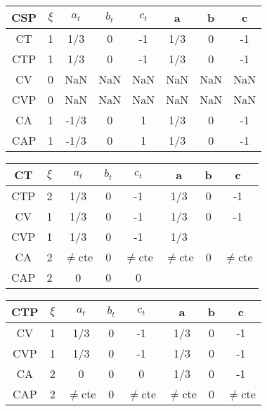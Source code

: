 \documentclass[twocolumn]{article}
\begin{document}
\begin{table}[H]
	\begin{tabular}{|c|c|c|c|c|c|c|c|}
		\hline
		CSP & $\xi $& $a_t$ & $b_t$ & $c_t$ & a & b & c \\
		\hline
		CT & 1 & 1/3  & 0 & -1 & 1/3  & 0 & -1 \\
		\hline
		CTP & 1 & 1/3  & 0  & -1  & 1/3  & 0 & -1 \\
		\hline
		CV &  0 & NaN  & NaN  & NaN  &NaN & NaN  &  NaN \\
		\hline
		CVP & 0  & NaN  &  NaN  &  NaN  & NaN  & NaN &  NaN\\
		\hline
		CA & 1 & -1/3 & 0  & 1  & 1/3  & 0 & -1   \\
		\hline
		CAP & 1 &  -1/3 & 0  & 1  & 1/3  & 0 & -1  \\
		\hline
	\end{tabular}
\end{table}

\begin{table}[H]
	\begin{tabular}{|c|c|c|c|c|c|c|c|}
		\hline
		CT & $\xi $& $a_t$ & $b_t$ & $c_t$ & a & b & c \\
		\hline
		CTP & 2 & 1/3  & 0  &  -1  & 1/3  & 0  &  -1 \\
		\hline
		CV & 1 & 1/3  & 0  & -1  & 1/3  & 0  &  -1 \\
		\hline
		CVP & 1 & 1/3  & 0  &  -1 & 1/3  &   &   \\
		\hline
		CA & 2 & $\neq$cte  & 0 &  $\neq$cte & $\neq$cte  & 0 &  $\neq$cte \\
		\hline
		CAP & 2 & 0  & 0  & 0  &   &   &   \\
		\hline
	\end{tabular}
\end{table}

\begin{table}[H]
	\begin{tabular}{|c|c|c|c|c|c|c|c|}
		\hline
		CTP & $\xi $& $a_t$ & $b_t$ & $c_t$ & a & b & c \\
		\hline
		CV & 1 & 1/3  & 0 &  -1 &  1/3  & 0 &  -1\\
		\hline
		CVP & 1 & 1/3  & 0 & -1  & 1/3  & 0  &  -1\\
		\hline
		CA & 2 & 0  & 0 & 0  & 1/3  & 0 &  -1 \\
		\hline
		CAP & 2 & $\neq$cte  & 0  &  $\neq$cte & $\neq$cte  & 0 &  $\neq$cte \\
		\hline
	\end{tabular}
\end{table}
\end{document}
